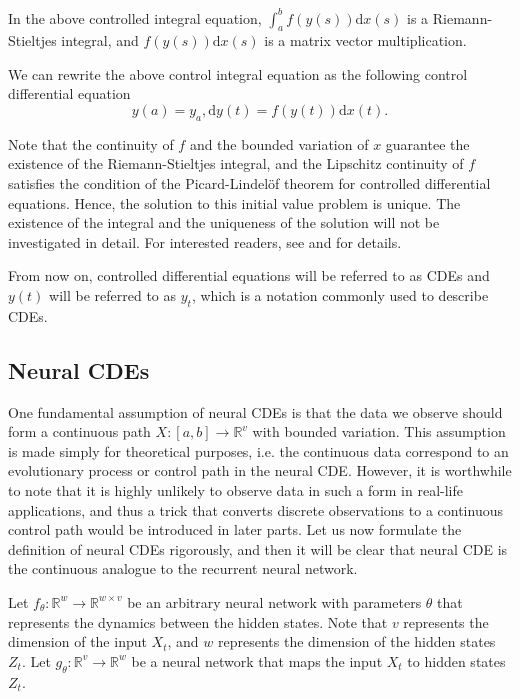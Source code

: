 \documentclass[a4paper,11pt,titlepage]{article}
\theoremstyle{definition}
\theoremstyle{plain}
\theoremstyle{remark}
\begin{document}
In the above controlled integral equation, $\int_a^bf(y(s))\mathrm{d}x(s)$ is a Riemann-Stieltjes integral, and $f(y(s))\mathrm{d}x(s)$ is a matrix vector multiplication.

We can rewrite the above control integral equation as the following control differential equation
$$y(a)=y_a, \mathrm{d}y(t) = f(y(t))\mathrm{d}x(t).$$

Note that the continuity of $f$ and the bounded variation of $x$ guarantee the existence of the Riemann-Stieltjes integral, and the Lipschitz continuity of $f$ satisfies the condition of the Picard-Lindelöf theorem for controlled differential equations. Hence, the solution to this initial value problem is unique. The existence of the integral and the uniqueness of the solution will not be investigated in detail. For interested readers, see \cite{rudin1953} and \cite{kidger2022neural} for details.

From now on, controlled differential equations will be referred to as CDEs and $y(t)$ will be referred to as $y_t$, which is a notation commonly used to describe CDEs.

\subsection{Neural CDEs}

One fundamental assumption of neural CDEs is that the data we observe should form a continuous path $X:[a,b]\rightarrow\mathbb{R}^v$ with bounded variation. This assumption is made simply for theoretical purposes, i.e. the continuous data correspond to an evolutionary process or control path in the neural CDE. However, it is worthwhile to note that it is highly unlikely to observe data in such a form in real-life applications, and thus a trick that converts discrete observations to a continuous control path would be introduced in later parts. Let us now formulate the definition of neural CDEs rigorously, and then it will be clear that neural CDE is the continuous analogue to the recurrent neural network.

Let $f_\theta:\mathbb{R}^w\rightarrow\mathbb{R}^{w\times v}$ be an arbitrary neural network with parameters $\theta$ that represents the dynamics between the hidden states. Note that $v$ represents the dimension of the input $X_t$, and $w$ represents the dimension of the hidden states $Z_t$. Let $g_\theta:\mathbb{R}^v\rightarrow\mathbb{R}^w$ be a neural network that maps the input $X_t$ to hidden states $Z_t$.
\end{document}

